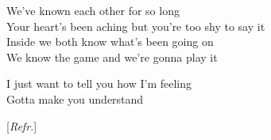\newpage
We've known each other for so long\\
Your heart's been aching but you're too shy to say it\\
Inside we both know what's been going on\\
We know the game and we're gonna play it\par
\vspace{10pt}
I just want to tell you how I'm feeling\\
Gotta make you understand\par
\vspace{10pt}
{\footnotesize[\textit{Refr.}]}%
